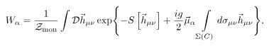 \begin{equation}
\label{danuovo}
W_\alpha=
\frac{1}{{\cal Z}_{\rm mon}}
\int{\cal D}\vec h_{\mu\nu}
\exp\Biggl\{-S\left[\vec h_{\mu\nu}\right]
+\frac{ig}{2}\vec\mu_\alpha\int\limits_{\Sigma(C)}^{}d\sigma_{\mu\nu}\vec h_{\mu\nu}\Biggr\},
\end{equation}

